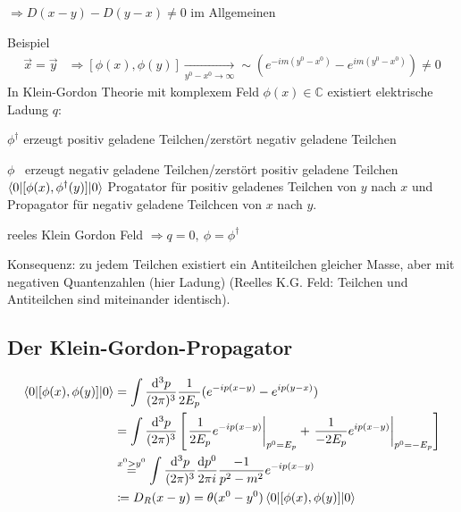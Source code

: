 $\Rightarrow D(x-y) - D(y-x) \neq 0 $ im Allgemeinen

Beispiel 
	\begin{align*}
		\vec{x} = \vec{y} &\Rightarrow [\phi(x), \phi(y)]
		\underset{y^0 -x^0 \rightarrow \infty}{\longrightarrow} \sim
		\left(e^{-im(y^0 -x^0)} - e^{im (y^0 -x^0)}\right) \neq 0
	\end{align*}	
In Klein-Gordon Theorie mit komplexem Feld $\phi (x) \in \mathds{C}$ existiert elektrische Ladung $q$:

$\phi^\dagger$ erzeugt positiv geladene Teilchen/zerstört negativ geladene Teilchen

$\phi$ ~erzeugt negativ geladene Teilchen/zerstört positiv geladene Teilchen
\\
$\braket{0 | [\phi(x), \phi^\dagger(y)] | 0}$ Progatator für positiv geladenes Teilchen von $y$ nach $x$ und Propagator für negativ geladene Teilchcen von $x$ nach $y$.

reeles Klein Gordon Feld $\Rightarrow q = 0,~\phi = \phi^\dagger$ 

Konsequenz: zu jedem Teilchen existiert ein Antiteilchen gleicher Masse, aber mit negativen Quantenzahlen (hier Ladung) (Reelles K.G. Feld: Teilchen und Antiteilchen sind miteinander identisch).

\subsection{Der Klein-Gordon-Propagator}
	\begin{align*}
		\braket{0 | [\phi(x), \phi(y)] | 0} &= 
		\int \frac{\mathrm{d}^3 p}{(2 \pi)^3} \frac{1}{2 E_p} (e^{-i p(x- y)} - e^{ip (y-x)}) \\
		&= \int \frac{\mathrm{d}^3 p}{(2 \pi)^3}  
		\left[
			 \left. \frac{1}{2 E_p} e^{-ip(x-y)} \right|_{p^0 = E_p}
			 + \left.  \frac{1}{- 2 E_p} e^{ip(x-y)} \right|_{p^0 = -E_p}
		\right] \\
		&\overset{x^0 > y^0}{=}
		\int \frac{\mathrm{d}^3 p}{(2 \pi)^3} \frac{\mathrm{d} p^0}{2 \pi i}
		\frac{-1}{p^2 -m^2} e^{-ip(x-y)} \\
		&\coloneqq D_R (x-y) = \theta(x^0 -y^0) 
		\braket{0 | [\phi(x), \phi(y)] | 0}
	\end{align*}

